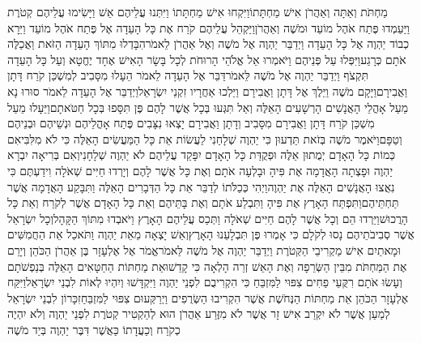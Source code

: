 \documentclass[../main/main.tex]{subfiles}
\begin{document}
\begin{multicols*}{\ncols}
מַחְתֹּת וְאַתָּה וְאַהֲרֹן אִישׁ מַחְתָּתוֹ\PreVerseSpace{}וַיִּקְחוּ אִישׁ מַחְתָּתוֹ וַיִּתְּנוּ עֲלֵיהֶם אֵשׁ וַיָּשִׂימוּ עֲלֵיהֶם קְטֹרֶת וַיַּעַמְדוּ פֶּתַח אֹהֶל מוֹעֵד וּמֹשֶׁה וְאַהֲרֹן\PreVerseSpace{}וַיַּקְהֵל עֲלֵיהֶם קֹרַח אֶת כָּל הָעֵדָה אֶל פֶּתַח אֹהֶל מוֹעֵד וַיֵּרָא כְבוֹד יַהְוֶה אֶל כָּל הָעֵדָה \ClosedSection{}וַיְדַבֵּר יַהְוֶה אֶל מֹשֶׁה וְאֶל אַהֲרֹן לֵאמֹר\PreVerseSpace{}הִבָּדְלוּ מִתּוֹךְ הָעֵדָה הַזֹּאת וַאֲכַלֶּה אֹתָם כְּרָגַע\PreVerseSpace{}וַיִּפְּלוּ עַל פְּנֵיהֶם וַיֹּאמְרוּ אֵל אֱלֹהֵי הָרוּחֹת לְכָל בָּשָׂר הָאִישׁ אֶחָד יֶחֱטָא וְעַל כָּל הָעֵדָה תִּקְצֹף \ClosedSection{}וַיְדַבֵּר יַהְוֶה אֶל מֹשֶׁה לֵּאמֹר\PreVerseSpace{}דַּבֵּר אֶל הָעֵדָה לֵאמֹר הֵעָלוּ מִסָּבִיב לְמִשְׁכַּן קֹרַח דָּתָן וַאֲבִירָם\PreVerseSpace{}וַיָּקָם מֹשֶׁה וַיֵּלֶךְ אֶל דָּתָן וַאֲבִירָם וַיֵּלְכוּ אַחֲרָיו זִקְנֵי יִשְׂרָאֵל\PreVerseSpace{}וַיְדַבֵּר אֶל הָעֵדָה לֵאמֹר סוּרוּ נָא מֵעַל אָהֳלֵי הָאֲנָשִׁים הָרְשָׁעִים הָאֵלֶּה וְאַל תִּגְּעוּ בְּכָל אֲשֶׁר לָהֶם פֶּן תִּסָּפוּ בְּכָל חַטֹּאתָם\PreVerseSpace{}וַיֵּעָלוּ מֵעַל מִשְׁכַּן קֹרַח דָּתָן וַאֲבִירָם מִסָּבִיב וְדָתָן וַאֲבִירָם יָצְאוּ נִצָּבִים פֶּתַח אָהֳלֵיהֶם וּנְשֵׁיהֶם וּבְנֵיהֶם וְטַפָּם\PreVerseSpace{}וַיֹּאמֶר מֹשֶׁה בְּזֹאת תֵּדְעוּן כִּי יַהְוֶה שְׁלָחַנִי לַעֲשׂוֹת אֵת כָּל הַמַּעֲשִׂים הָאֵלֶּה כִּי לֹא מִלִּבִּי\PreVerseSpace{}אִם כְּמוֹת כָּל הָאָדָם יְמֻתוּן אֵלֶּה וּפְקֻדַּת כָּל הָאָדָם יִפָּקֵד עֲלֵיהֶם לֹא יַהְוֶה שְׁלָחָנִי\PreVerseSpace{}וְאִם בְּרִיאָה יִבְרָא יַהְוֶה וּפָצְתָה הָאֲדָמָה אֶת פִּיהָ וּבָלְעָה אֹתָם וְאֶת כָּל אֲשֶׁר לָהֶם וְיָרְדוּ חַיִּים שְׁאֹלָה וִידַעְתֶּם כִּי נִאֲצוּ הָאֲנָשִׁים הָאֵלֶּה אֶת יַהְוֶה\PreVerseSpace{}וַיְהִי כְּכַלֹּתוֹ לְדַבֵּר אֵת כָּל הַדְּבָרִים הָאֵלֶּה וַתִּבָּקַע הָאֲדָמָה אֲשֶׁר תַּחְתֵּיהֶם\PreVerseSpace{}וַתִּפְתַּח הָאָרֶץ אֶת פִּיהָ וַתִּבְלַע אֹתָם וְאֶת בָּתֵּיהֶם וְאֵת כָּל הָאָדָם אֲשֶׁר לְקֹרַח וְאֵת כָּל הָרֲכוּשׁ\PreVerseSpace{}וַיֵּרְדוּ הֵם וְכָל אֲשֶׁר לָהֶם חַיִּים שְׁאֹלָה וַתְּכַס עֲלֵיהֶם הָאָרֶץ וַיֹּאבְדוּ מִתּוֹךְ הַקָּהָל\PreVerseSpace{}וְכָל יִשְׂרָאֵל אֲשֶׁר סְבִיבֹתֵיהֶם נָסוּ לְקֹלָם כִּי אָמְרוּ פֶּן תִּבְלָעֵנוּ הָאָרֶץ\PreVerseSpace{}וְאֵשׁ יָצְאָה מֵאֵת יַהְוֶה וַתֹּאכַל אֵת הַחֲמִשִּׁים וּמָאתַיִם אִישׁ מַקְרִיבֵי הַקְּטֹרֶת \ClosedSection{}וַיְדַבֵּר יַהְוֶה אֶל מֹשֶׁה לֵּאמֹר\PreVerseSpace{}אֱמֹר אֶל אֶלְעָזָר בֶּן אַהֲרֹן הַכֹּהֵן וְיָרֵם אֶת הַמַּחְתֹּת מִבֵּין הַשְּׂרֵפָה וְאֶת הָאֵשׁ זְרֵה הָלְאָה כִּי קָדֵשׁוּ\PreVerseSpace{}אֵת מַחְתּוֹת הַחַטָּאִים הָאֵלֶּה בְּנַפְשֹׁתָם וְעָשׂוּ אֹתָם רִקֻּעֵי פַחִים צִפּוּי לַמִּזְבֵּחַ כִּי הִקְרִיבֻם לִפְנֵי יַהְוֶה וַיִּקְדָּשׁוּ וְיִהְיוּ לְאוֹת לִבְנֵי יִשְׂרָאֵל\PreVerseSpace{}וַיִּקַּח אֶלְעָזָר הַכֹּהֵן אֵת מַחְתּוֹת הַנְּחֹשֶׁת אֲשֶׁר הִקְרִיבוּ הַשְּׂרֻפִים וַיְרַקְּעוּם צִפּוּי לַמִּזְבֵּחַ\PreVerseSpace{}זִכָּרוֹן לִבְנֵי יִשְׂרָאֵל לְמַעַן אֲשֶׁר לֹא יִקְרַב אִישׁ זָר אֲשֶׁר לֹא מִזֶּרַע אַהֲרֹן הוּא לְהַקְטִיר קְטֹרֶת לִפְנֵי יַהְוֶה וְלֹא יִהְיֶה כְקֹרַח וְכַעֲדָתוֹ כַּאֲשֶׁר דִּבֶּר יַהְוֶה בְּיַד מֹשֶׁה 
\end{multicols*}
\end{document}
